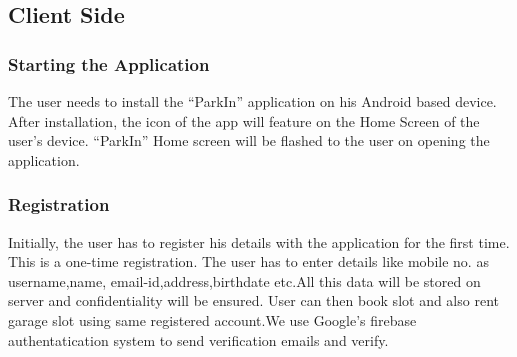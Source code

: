 \documentclass[12pt, english]{article}
\begin{document}
\subsection{Client Side}
\subsubsection{Starting the Application}
The user needs to install the “ParkIn” application on his Android based device. After installation, the icon of the app will feature on the Home Screen of the user’s device. “ParkIn” Home screen will be flashed to the user on opening the application.
\subsubsection{Registration}
Initially, the user has to register his details with the application for the first time. This is a one-time registration. The user has to enter details like mobile no. as username,name, email-id,address,birthdate etc.All this data will be stored on server and confidentiality will be ensured.
User can then book slot and also rent garage slot using same registered account.We use Google's firebase authentatication system to send verification emails and verify.
\end{document}
